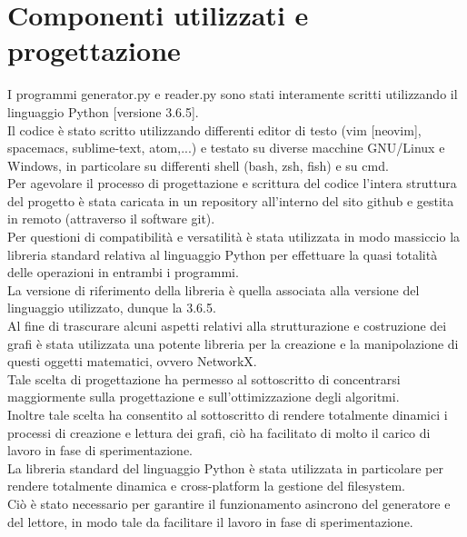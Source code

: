 \section{Componenti utilizzati e progettazione}
\justify
I programmi generator.py e reader.py sono stati interamente scritti utilizzando il linguaggio Python [versione 3.6.5].\\

Il codice è stato scritto utilizzando differenti editor di testo (vim [neovim], spacemacs, sublime-text, atom,...) e testato su diverse macchine GNU/Linux e Windows, in particolare su differenti shell (bash, zsh, fish) e su cmd.\\

Per agevolare il processo di progettazione e scrittura del codice l'intera struttura del progetto è stata caricata in un repository all'interno del sito github e gestita in remoto (attraverso il software git).\\

Per questioni di compatibilità e versatilità è stata utilizzata in modo massiccio la libreria standard relativa al linguaggio Python per effettuare la quasi totalità delle operazioni in entrambi i programmi.\\

La versione di riferimento della libreria è quella associata alla versione del linguaggio utilizzato, dunque la 3.6.5.\\

Al fine di trascurare alcuni aspetti relativi alla strutturazione e costruzione dei grafi è stata utilizzata una potente libreria per la creazione e la manipolazione di questi oggetti matematici, ovvero NetworkX.\\

Tale scelta di progettazione ha permesso al sottoscritto di concentrarsi maggiormente sulla progettazione e sull'ottimizzazione degli algoritmi.\\

Inoltre tale scelta ha consentito al sottoscritto di rendere totalmente dinamici i processi di creazione e lettura dei grafi, ciò ha facilitato di molto il carico di lavoro in fase di sperimentazione.\\

La libreria standard del linguaggio Python è stata utilizzata in particolare per rendere totalmente dinamica e cross-platform la gestione del filesystem.\\

Ciò è stato necessario per garantire il funzionamento asincrono del generatore e del lettore, in modo tale da facilitare il lavoro in fase di sperimentazione.\\

